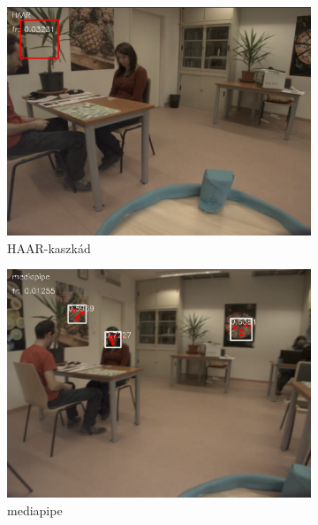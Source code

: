 \begin{figure}
\begin{subfigure}[b]{0.3\linewidth}
        \includegraphics[width=\linewidth]{figures/video_comparison/false_positives/video_comparison_haar_false_positive.png}
        \caption{HAAR-kaszkád}
    \end{subfigure}
    \begin{subfigure}[b]{0.3\linewidth}
        \includegraphics[width=\linewidth]{figures/video_comparison/false_positives/video_comparison_mediapipe_false_positive.png}
        \caption{mediapipe}
    \end{subfigure}
    \begin{subfigure}[b]{0.3\linewidth}

\end{subfigure}
\end{figure}
